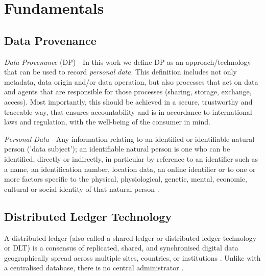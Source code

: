 \chapter{Fundamentals}
\label{ch:Fundamentals}

\section{Data Provenance}
\label{sec:dp}

\begin{minipage}\textwidth

\textit{Data Provenance} (DP) - In this work we define DP as an approach/technology that can be used to record \textit{personal data}. This definition includes not only metadata, data origin and/or data operation, but also processes that act on data and agents that are responsible for those processes (sharing, storage, exchange, access). Most importantly, this should be achieved in a secure, trustworthy and traceable way, that ensures accountability and is in accordance to international laws and regulation, with the well-being of the consumer in mind. \newline

\textit{Personal Data} - Any information relating to an identified or identifiable natural person ('data subject'); an identifiable natural person is one who can be identified, directly or indirectly, in particular by reference to an identifier such as a name, an identification number, location data, an online identifier or to one or more factors specific to the physical, physiological, genetic, mental, economic, cultural or social identity of that natural person \cite{personal_data}.

\end{minipage}


\section{Distributed Ledger Technology}
\label{sec:dlt}

A distributed ledger (also called a shared ledger or distributed ledger technology or DLT) is a consensus of replicated, shared, and synchronised digital data geographically spread across multiple sites, countries, or institutions \cite{dlt_1}. Unlike with a centralised database, there is no central administrator \cite{dlt_60}.

